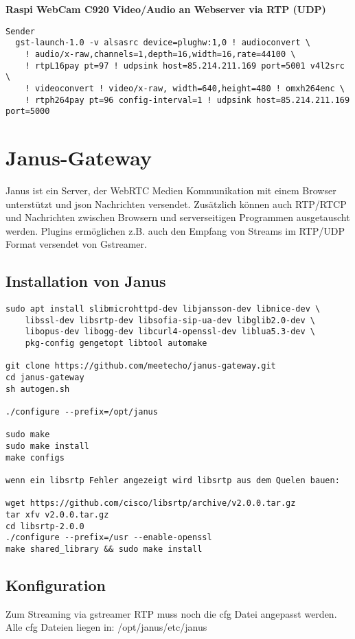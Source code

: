 \textbf{Raspi WebCam C920 Video/Audio an Webserver via RTP (UDP)}
\begin{verbatim}
Sender
  gst-launch-1.0 -v alsasrc device=plughw:1,0 ! audioconvert \
    ! audio/x-raw,channels=1,depth=16,width=16,rate=44100 \
    ! rtpL16pay pt=97 ! udpsink host=85.214.211.169 port=5001 v4l2src \
    ! videoconvert ! video/x-raw, width=640,height=480 ! omxh264enc \
    ! rtph264pay pt=96 config-interval=1 ! udpsink host=85.214.211.169 port=5000
\end{verbatim}

\section{Janus-Gateway} \label{RefJanus}
Janus ist ein Server, der WebRTC Medien Kommunikation mit einem Browser unterstützt und json Nachrichten versendet. Zusätzlich können auch RTP/RTCP und Nachrichten zwischen Browsern und serverseitigen Programmen ausgetauscht werden. Plugins ermöglichen z.B. auch den Empfang von Streams im RTP/UDP Format versendet von Gstreamer. 

\subsection{Installation von Janus}
\begin{verbatim}
sudo apt install slibmicrohttpd-dev libjansson-dev libnice-dev \
	libssl-dev libsrtp-dev libsofia-sip-ua-dev libglib2.0-dev \
	libopus-dev libogg-dev libcurl4-openssl-dev liblua5.3-dev \
	pkg-config gengetopt libtool automake

git clone https://github.com/meetecho/janus-gateway.git
cd janus-gateway
sh autogen.sh

./configure --prefix=/opt/janus

sudo make 
sudo make install 
make configs

wenn ein libsrtp Fehler angezeigt wird libsrtp aus dem Quelen bauen:

wget https://github.com/cisco/libsrtp/archive/v2.0.0.tar.gz
tar xfv v2.0.0.tar.gz
cd libsrtp-2.0.0
./configure --prefix=/usr --enable-openssl
make shared_library && sudo make install
\end{verbatim}

\subsection{Konfiguration}
Zum Streaming via gstreamer RTP muss noch die cfg Datei angepasst werden.\\
Alle cfg Dateien liegen in: /opt/janus/etc/janus\\

